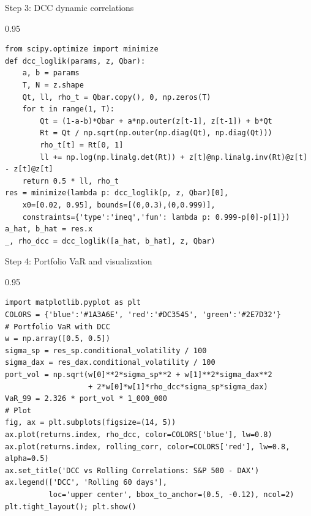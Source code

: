 \documentclass[9pt, aspectratio=169, t]{beamer}
\begin{document}
\begin{frame}[fragile]{Step 3: DCC dynamic correlations}
    \begin{cminipage}{0.95\textwidth}
    {\scriptsize
\begin{lstlisting}
from scipy.optimize import minimize
def dcc_loglik(params, z, Qbar):
    a, b = params
    T, N = z.shape
    Qt, ll, rho_t = Qbar.copy(), 0, np.zeros(T)
    for t in range(1, T):
        Qt = (1-a-b)*Qbar + a*np.outer(z[t-1], z[t-1]) + b*Qt
        Rt = Qt / np.sqrt(np.outer(np.diag(Qt), np.diag(Qt)))
        rho_t[t] = Rt[0, 1]
        ll += np.log(np.linalg.det(Rt)) + z[t]@np.linalg.inv(Rt)@z[t] - z[t]@z[t]
    return 0.5 * ll, rho_t
res = minimize(lambda p: dcc_loglik(p, z, Qbar)[0],
    x0=[0.02, 0.95], bounds=[(0,0.3),(0,0.999)],
    constraints={'type':'ineq','fun': lambda p: 0.999-p[0]-p[1]})
a_hat, b_hat = res.x
_, rho_dcc = dcc_loglik([a_hat, b_hat], z, Qbar)
\end{lstlisting}
    }
    \end{cminipage}
\end{frame}

\begin{frame}[fragile]{Step 4: Portfolio VaR and visualization}
    \begin{cminipage}{0.95\textwidth}
    {\scriptsize
\begin{lstlisting}
import matplotlib.pyplot as plt
COLORS = {'blue':'#1A3A6E', 'red':'#DC3545', 'green':'#2E7D32'}
# Portfolio VaR with DCC
w = np.array([0.5, 0.5])
sigma_sp = res_sp.conditional_volatility / 100
sigma_dax = res_dax.conditional_volatility / 100
port_vol = np.sqrt(w[0]**2*sigma_sp**2 + w[1]**2*sigma_dax**2
                   + 2*w[0]*w[1]*rho_dcc*sigma_sp*sigma_dax)
VaR_99 = 2.326 * port_vol * 1_000_000
# Plot
fig, ax = plt.subplots(figsize=(14, 5))
ax.plot(returns.index, rho_dcc, color=COLORS['blue'], lw=0.8)
ax.plot(returns.index, rolling_corr, color=COLORS['red'], lw=0.8, alpha=0.5)
ax.set_title('DCC vs Rolling Correlations: S&P 500 - DAX')
ax.legend(['DCC', 'Rolling 60 days'],
          loc='upper center', bbox_to_anchor=(0.5, -0.12), ncol=2)
plt.tight_layout(); plt.show()
\end{lstlisting}
    }
    \end{cminipage}
\end{frame}
\end{document}
